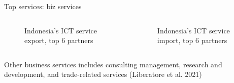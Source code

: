 \documentclass[
  ignorenonframetext,
]{beamer}
\begin{document}
\begin{frame}{Top services: biz services}
\label{top-services-biz-services}
\begin{columns}[T]
\begin{column}{0.47\textwidth}
\begin{figure}


\caption{\label{fig-SX}Indonesia's ICT service export, top 6 partners}

\end{figure}%
\end{column}

\begin{column}{0.47\textwidth}
\begin{figure}


\caption{\label{fig-SM}Indonesia's ICT service import, top 6 partners}

\end{figure}%
\end{column}
\end{columns}

Other business services includes consulting management, research and
development, and trade-related services (Liberatore et al. 2021)
\end{frame}
\end{document}
